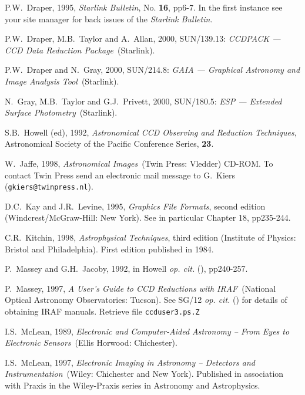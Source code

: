 \documentclass[twoside,11pt]{article}
\newcommand{\htmladdnormallink}[2]{#1}
\newcommand{\latex}[1]{#1}
\newcommand{\xref}[3]{#1}
\begin{document}
\begin{thebibliography}{99}
   P.W.~Draper, 1995, 
  \htmladdnormallink{{\it Starlink Bulletin}}
   {http://star-www.rl.ac.uk//bulletin.html},
   No. {\bf 16}, pp6-7.  In the first instance see your site manager
   for back issues of the {\it Starlink Bulletin}.

   P.W.~Draper, M.B.~Taylor and A.~Allan, 2000,
   \xref{SUN/139.13}{sun139}{}: {\it CCDPACK --- CCD Data Reduction
   Package}\, (Starlink).

   P.W.~Draper and N.~Gray, 2000,
   \xref{SUN/214.8}{sun214}{}: {\it GAIA --- Graphical Astronomy and Image
   Analysis Tool}\, (Starlink).

   N.~Gray, M.B.~Taylor and G.J.~Privett, 2000,
   \xref{SUN/180.5}{sun180}{}: {\it ESP --- Extended Surface Photometry}\,
   (Starlink).

   S.B.~Howell (ed), 1992, {\it Astronomical CCD
   Observing and Reduction Techniques}, Astronomical Society of the
   Pacific Conference Series, {\bf 23}.

   W.~Jaffe, 1998, {\it Astronomical Images}\,
   (Twin Press: Vledder) CD-ROM.  To contact Twin Press send an electronic
   mail message to G.~Kiers ({\tt gkiers@twinpress.nl}).

   D.C.~Kay and J.R.~Levine, 1995, {\it Graphics File
   Formats}, second edition
  \newline (Windcrest/McGraw-Hill: New York).  See in particular
   Chapter 18, pp235-244.

   C.R.~Kitchin, 1998, {\it Astrophysical Techniques},
   third edition (Institute of Physics: Bristol and Philadelphia).
   First edition published in 1984.

   P.~Massey and G.H.~Jacoby, 1992, in Howell
   {\it op. cit.}\/ (\cite{HOWELL92}), pp240-257.

   P.~Massey, 1997, {\it A User's Guide to CCD
   Reductions with IRAF}\, (National Optical Astronomy Observatories:
   Tucson).  See \xref{SG/12}{sg12}{} {\it op. cit.}\/ (\cite{SG12}) for
   details of obtaining IRAF manuals.  Retrieve file {\tt ccduser3.ps.Z}

   I.S.~McLean, 1989, {\it Electronic and Computer-Aided
   Astronomy -- From Eyes to Electronic Sensors}\, (Ellis Horwood:
   Chichester).

   I.S.~McLean, 1997, {\it Electronic Imaging in
   Astronomy -- Detectors and Instrumentation}\, (Wiley: Chichester and
   New York).  Published in association with Praxis in the Wiley-Praxis
   series in Astronomy and Astrophysics.


\end{thebibliography}
\end{document}

